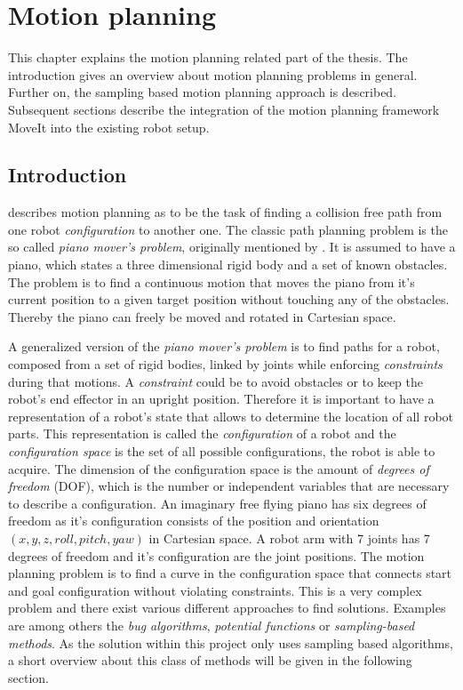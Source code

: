 
\chapter{Motion planning}
\label{chap:moveit}
This chapter explains the motion planning related part of the thesis. The introduction gives an overview about motion planning problems in general. Further on, the sampling based motion planning approach is described. Subsequent sections describe the integration of the motion planning framework MoveIt into the existing robot setup.

\section{Introduction}

\citep[p. 1--11]{choset2005} describes motion planning as to be the task of finding a collision free path from one robot \emph{configuration} to another one. The classic path planning problem is the so called \emph{piano mover's problem}, originally mentioned by \cite{schwartz1983}. It is assumed to have a piano, which states a three dimensional rigid body and a set of known obstacles. The problem is to find a continuous motion that moves the piano from it's current position to a given target position without touching any of the obstacles. Thereby the piano can freely be moved and rotated in Cartesian space. 

A generalized version of the \emph{piano mover's problem} is to find paths for a robot, composed from a set of rigid bodies, linked by joints while enforcing \emph{constraints} during that motions. A \emph{constraint} could be to avoid obstacles or to keep the robot's end effector in an upright position. Therefore it is important to have a representation of a robot's state that allows to determine the location of all robot parts. This representation is called the \emph{configuration} of a robot and the \emph{configuration space} is the set of all possible configurations, the robot is able to acquire. The dimension of the configuration space is the amount of \emph{degrees of freedom} (DOF), which is the number or independent variables that are necessary to describe a configuration. An imaginary free flying piano has six degrees of freedom as it's configuration consists of the position and orientation $(x,y,z,roll,pitch,yaw)$ in Cartesian space. A robot arm with 7 joints has 7 degrees of freedom and it's configuration are the joint positions. The motion planning problem is to find a curve in the configuration space that connects start and goal configuration without violating constraints. This is a very complex problem and there exist various different approaches to find solutions. Examples are among others the \emph{bug algorithms}\citep[chapter 2]{choset2005}, \emph{potential functions}\citep[chapter 4]{choset2005} or \emph{sampling-based methods}\citep[chapter 7]{choset2005}. As the solution within this project only uses sampling based algorithms, a short overview about this class of methods will be given in the following section.

